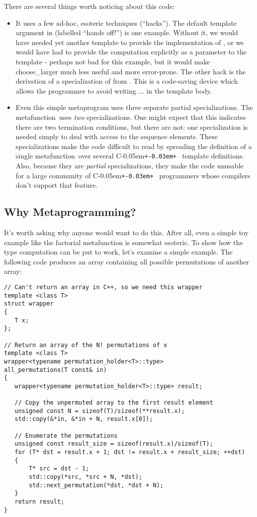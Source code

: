 \documentclass{netobjectdays}
\newcommand{\Cpp}{C\kern-0.05em\texttt{+\kern-0.03em+}%
}
\newcommand{\mfn}{meta\-function}
\begin{document}
There are several things worth noticing about this code:
\begin{itemize}

\item It uses a few ad-hoc, esoteric techniques (``hacks''). The
  default template argument  in 
  (labelled ``hands off!'') is one example. Without it, we would have
  needed yet another template to provide the implementation of
  , or we would have had to provide the
  computation explicitly as a parameter to the template - perhaps not
  bad for this example, but it would make choose_larger much less
  useful and more error-prone. The other hack is the derivation of a
  specialization of  from . This is
  a code-saving device which allows the programmer to avoid writing
  ... in the template body.

\item Even this simple metaprogram uses three separate partial
  specializations. The  \mfn\ uses \emph{two}
  specializations. One might expect that this indicates there are two
  termination conditions, but there are not: one specialization is
  needed simply to deal with access to the sequence elements. These
  specializations make the code difficult to read by spreading the
  definition of a single \mfn\ over several \Cpp\ template
  definitions. Also, because they are \emph{partial} specializations,
  they make the code unusable for a large community of \Cpp\
  programmers whose compilers don't support that feature.
\end{itemize}

\subsection{Why Metaprogramming?}

It's worth asking why anyone would want to do this. After all, even a
simple toy example like the factorial metafunction is somewhat
esoteric. To show how the type computation can be put to work, let's
examine a simple example. The following code produces an array
containing all possible permutations of another array:
{\footnotesize
\begin{verbatim}
// Can't return an array in C++, so we need this wrapper
template <class T>
struct wrapper
{
   T x;
};

// Return an array of the N! permutations of x
template <class T>
wrapper<typename permutation_holder<T>::type>
all_permutations(T const& in)
{
   wrapper<typename permutation_holder<T>::type> result;

   // Copy the unpermuted array to the first result element
   unsigned const N = sizeof(T)/sizeof(**result.x);
   std::copy(&*in, &*in + N, result.x[0]);

   // Enumerate the permutations
   unsigned const result_size = sizeof(result.x)/sizeof(T);
   for (T* dst = result.x + 1; dst != result.x + result_size; ++dst)
   {
       T* src = dst - 1;
       std::copy(*src, *src + N, *dst);
       std::next_permutation(*dst, *dst + N);
   }
   return result;
}
\end{verbatim}
}
\end{document}
